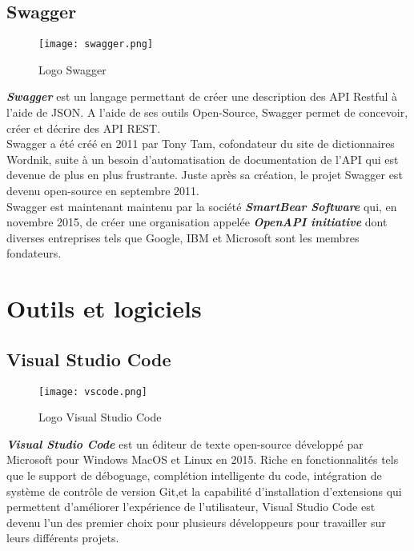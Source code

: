 \subsection{Swagger}
\vspace{1cm}
\begin{figure}[H]
    \centering
    \texttt{[image: swagger.png]}
    \vspace{1cm}
    \captionsetup{justification=centering}

    \caption{Logo Swagger}
    \label{fig:swagger_logo}
\end{figure}
\textit{\textbf{Swagger}} \cite{swagger} est un langage permettant de créer une description des API Restful à l'aide de JSON. A l'aide de ses outils Open-Source, Swagger permet de concevoir, créer et décrire des API REST.\\
\noindent Swagger a été créé en 2011 par Tony Tam, cofondateur du site de dictionnaires Wordnik, suite à un besoin d'automatisation de documentation de l'API qui est devenue de plus en plus frustrante. Juste après sa création, le projet Swagger est devenu open-source en septembre 2011.\\
\noindent Swagger est maintenant maintenu par la société \textit{\textbf{SmartBear Software}} qui, en novembre 2015, de créer une organisation appelée \textit{\textbf{OpenAPI initiative}} dont diverses entreprises tels que Google, IBM et Microsoft sont les membres fondateurs.\\
\section{Outils et logiciels}
\subsection{Visual Studio Code}
\begin{figure}[H]
    \centering
    \texttt{[image: vscode.png]}
    \vspace{1cm}
    \captionsetup{justification=centering}
    \caption{Logo Visual Studio Code}
    \label{fig:vscode_logo}
\end{figure}
\textit{\textbf{Visual Studio Code}} \cite{vscode} est un éditeur de texte open-source développé par Microsoft \cite{microsoft} pour Windows MacOS et Linux en 2015. Riche en fonctionnalités tels que le support de déboguage, complétion intelligente du code, intégration de système de contrôle de version Git,et la capabilité d'installation d'extensions qui permettent d'améliorer l'expérience de l'utilisateur, Visual Studio Code est devenu l'un des premier choix pour plusieurs développeurs pour travailler sur leurs différents projets.

